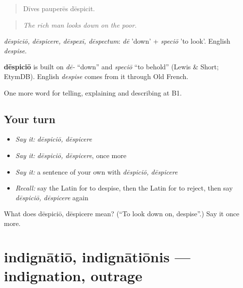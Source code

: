 \begin{quote}
Dīves pauperēs dēspicit.
\end{quote}

\begin{quote}
\emph{The rich man looks down on the poor.}
\end{quote}

\emph{dēspiciō, dēspicere, dēspexī, dēspectum}: \emph{dē} 'down' + \emph{speciō} 'to look'. English \emph{despise}.

\begin{cousinweb}
\textbf{dēspiciō} is built on \emph{dē-} \textquotedblleft{}down\textquotedblright{} and \emph{speciō} \textquotedblleft{}to behold\textquotedblright{} (Lewis \& Short; EtymDB). English \emph{despise} comes from it through Old French.
\end{cousinweb}

\begin{grammarlens}[title={What you've built}]
One more word for telling, explaining and describing at B1.
\end{grammarlens}

\subsection*{Your turn}
\begin{itemize}
\raggedright
  \item \emph{Say it:} \emph{dēspiciō, dēspicere}
  \item \emph{Say it:} \emph{dēspiciō, dēspicere}, once more
  \item \emph{Say it:} a sentence of your own with \emph{dēspiciō, dēspicere}
  \item \emph{Recall:} say the Latin for to despise, then the Latin for to reject, then say \emph{dēspiciō, dēspicere} again
\end{itemize}

\begin{tcolorbox}[breakable,colback=teal!4,colframe=teal!35!black,title={Before you move on}]
What does dēspiciō, dēspicere mean? (\textquotedblleft{}To look down on, despise\textquotedblright{}.) Say it once more.
\end{tcolorbox}
\section[indignātiō, indignātiōnis]{indignātiō, indignātiōnis — indignation, outrage}

\label{lesson:LA-C514-indignatio}




